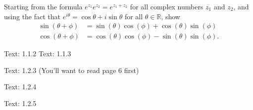 \documentclass[minion]{homework}
\newcommand{\Reals}{\mathbb{R}}
\begin{document}
\begin{problems}
\problem Starting from the formula $e^{z_1}e^{z_2} = e^{z_1+z_2}$
for all complex numbers $z_1$ and $z_2$, and using the fact
that $e^{i\theta}=\cos\theta+i\sin\theta$ for all $\theta\in\Reals$,
show
\begin{align*}
\sin(\theta+\phi) &= \sin(\theta)\cos(\phi) + \cos(\theta)\sin(\phi)\\
\cos(\theta+\phi) &= \cos(\theta)\cos(\phi) -\sin(\theta) \sin(\phi).
\end{align*}

\problem Text: 1.1.2
\problem Text: 1.1.3

\problem  Text: 1.2.3 (You'll want to read page 6 first)

\problem  Text: 1.2.4

\problem  Text: 1.2.5

\end{problems}
\end{document}
